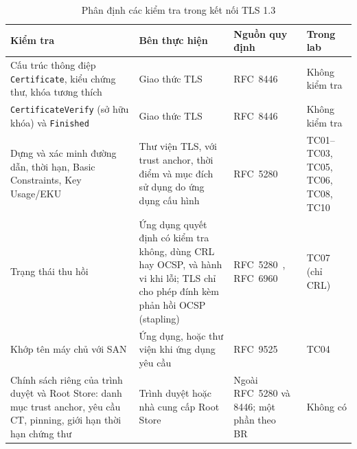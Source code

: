 \begin{table}[!htbp]
\centering
\small
\renewcommand{\arraystretch}{1.12}
\begin{tabularx}{\textwidth}{>{\raggedright\arraybackslash}p{3.5cm}>{\raggedright\arraybackslash}X>{\raggedright\arraybackslash}p{2.5cm}>{\raggedright\arraybackslash}p{2.3cm}}
\toprule
\textbf{Kiểm tra} & \textbf{Bên thực hiện} & \textbf{Nguồn quy định} & \textbf{Trong lab} \\
\midrule
Cấu trúc thông điệp \texttt{Certificate}, kiểu chứng thư, khóa tương thích & Giao thức TLS & RFC~8446~\cite{rfc8446} & Không kiểm tra \\
\midrule
\texttt{CertificateVerify} (sở hữu khóa) và \texttt{Finished} & Giao thức TLS & RFC~8446~\cite{rfc8446} & Không kiểm tra \\
\midrule
Dựng và xác minh đường dẫn, thời hạn, Basic Constraints, Key Usage/EKU & Thư viện TLS, với trust anchor, thời điểm và mục đích sử dụng do ứng dụng cấu hình & RFC~5280~\cite{rfc5280} & TC01--TC03, TC05, TC06, TC08, TC10 \\
\midrule
Trạng thái thu hồi & Ứng dụng quyết định có kiểm tra không, dùng CRL hay OCSP, và hành vi khi lỗi; TLS chỉ cho phép đính kèm phản hồi OCSP (stapling) & RFC~5280~\cite{rfc5280}, RFC~6960~\cite{rfc6960} & TC07 (chỉ CRL) \\
\midrule
Khớp tên máy chủ với SAN & Ứng dụng, hoặc thư viện khi ứng dụng yêu cầu & RFC~9525~\cite{rfc9525} & TC04 \\
\midrule
Chính sách riêng của trình duyệt và Root Store: danh mục trust anchor, yêu cầu CT, pinning, giới hạn thời hạn chứng thư & Trình duyệt hoặc nhà cung cấp Root Store & Ngoài RFC~5280 và 8446; một phần theo BR~\cite{cabforum_br} & Không có \\
\bottomrule
\end{tabularx}
\caption{Phân định các kiểm tra trong kết nối TLS 1.3}
\label{tab:tls-checks}
\end{table}
